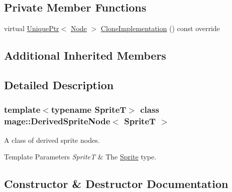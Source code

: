 \subsection*{Private Member Functions}
\begin{DoxyCompactItemize}
\item 
virtual \hyperlink{namespacemage_a3316d7143a973e37adf1110f2e80ca31}{Unique\+Ptr}$<$ \hyperlink{classmage_1_1_node}{Node} $>$ \hyperlink{classmage_1_1_derived_sprite_node_ae1aa2b80d4ff8688635df017826c11a5}{Clone\+Implementation} () const override
\end{DoxyCompactItemize}
\subsection*{Additional Inherited Members}


\subsection{Detailed Description}
\subsubsection*{template$<$typename SpriteT$>$\newline
class mage\+::\+Derived\+Sprite\+Node$<$ Sprite\+T $>$}

A class of derived sprite nodes.


\begin{DoxyTemplParams}{Template Parameters}
{\em SpriteT} & The \hyperlink{classmage_1_1_sprite}{Sprite} type. \\
\hline
\end{DoxyTemplParams}


\subsection{Constructor \& Destructor Documentation}
\hypertarget{classmage_1_1_derived_sprite_node_aa9eb13ba97d9338c67313cfc1c5108ff}{}\label{classmage_1_1_derived_sprite_node_aa9eb13ba97d9338c67313cfc1c5108ff} 
